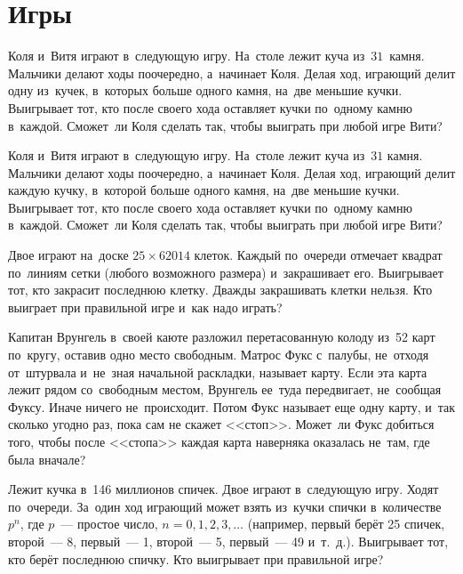 

\section*{Игры}


\begin{problems}

Коля и~Витя играют в~следующую игру.
На~столе лежит куча из~$31$~камня.
Мальчики делают ходы поочередно, а~начинает Коля.
Делая ход, играющий делит одну из~кучек, в~которых больше одного камня, на~две
меньшие кучки.
Выигрывает тот, кто после своего хода оставляет кучки по~одному камню в~каждой.
Сможет~ли Коля сделать так, чтобы выиграть при любой игре Вити?

\item
Коля и~Витя играют в~следующую игру.
На~столе лежит куча из~$31$ камня.
Мальчики делают ходы поочередно, а~начинает Коля.
Делая ход, играющий делит каждую кучку, в~которой больше одного камня, на~две
меньшие кучки.
Выигрывает тот, кто после своего хода оставляет кучки по~одному камню в~каждой.
Сможет~ли Коля сделать так, чтобы выиграть при любой игре Вити?

\item
Двое играют на~доске $25 \times 62014$ клеток.
Каждый по~очереди отмечает квадрат по~линиям сетки (любого возможного размера)
и~закрашивает его.
Выигрывает тот, кто закрасит последнюю клетку.
Дважды закрашивать клетки нельзя.
Кто выиграет при правильной игре и~как надо играть?

\item
Капитан Врунгель в~своей каюте разложил перетасованную колоду из~52 карт
по~кругу, оставив одно место свободным.
Матрос Фукс с~палубы, не~отходя от~штурвала и~не~зная начальной раскладки,
называет карту.
Если эта карта лежит рядом со~свободным местом, Врунгель ее~туда передвигает,
не~сообщая Фуксу.
Иначе ничего не~происходит.
Потом Фукс называет еще одну карту, и~так сколько угодно раз, пока сам не
скажет <<стоп>>.
Может~ли Фукс добиться того, чтобы после <<стопа>> каждая карта наверняка
оказалась не~там, где была вначале?

\item
Лежит кучка в~146 миллионов спичек.
Двое играют в~следующую игру.
Ходят по~очереди.
За~один ход играющий может взять из~кучки спички в~количестве $p^n$, где
$p$~--- простое число, $n = 0, 1, 2, 3, \ldots$
(например, первый берёт 25 спичек, второй~--- 8, первый~--- 1, второй~--- 5,
первый~--- 49 и~т.~д.).
Выигрывает тот, кто берёт последнюю спичку.
Кто выигрывает при правильной игре?


\end{problems}
